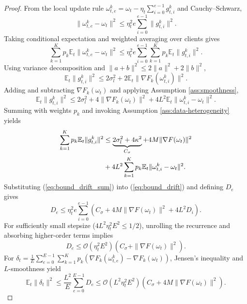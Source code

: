 \begin{proof}
From the local update rule $\omega_{t,e}^k=\omega_t-\eta_t\sum_{i=0}^{e-1}g_{t,i}^k$ and Cauchy--Schwarz,
\begin{equation}
\|\omega_{t,e}^k - \omega_t\|^2 \le \eta_t^2 e \sum_{i=0}^{e-1} \|g_{t,i}^k\|^2.
\end{equation}
Taking conditional expectation and weighted averaging over clients gives
\begin{equation}
\label{eq:bound_drift}
\sum_{k=1}^K p_k \mathbb{E}_t\|\omega_{t,e}^k - \omega_t\|^2
\le \eta_t^2 e \sum_{i=0}^{e-1} \sum_{k=1}^K p_k \mathbb{E}_t\|g_{t,i}^k\|^2.
\end{equation}
Using variance decomposition and $\|a+b\|^2 \le 2\|a\|^2+2\|b\|^2$,
\begin{equation}
\mathbb{E}_t\|g_{t,i}^k\|^2 \le 2\sigma_l^2 + 2\mathbb{E}_t\|\nabla F_k(\omega_{t,i}^k)\|^2.
\end{equation}
Adding and subtracting $\nabla F_k(\omega_t)$ and applying Assumption \ref{ass:smoothness},
\begin{equation}
\mathbb{E}_t\|g_{t,i}^k\|^2 \le 2\sigma_l^2 + 4\|\nabla F_k(\omega_t)\|^2 + 4L^2\mathbb{E}_t\|\omega_{t,i}^k - \omega_t\|^2.
\end{equation}
Summing with weights $p_k$ and invoking Assumption \ref{ass:data-heterogeneity} yields
\begin{align}
\label{eq:bound_drift_sum}
\sum_{k=1}^K p_k \mathbb{E}_t\|g_{t,i}^k\|^2
&\le \underbrace{2\sigma_l^2 + 4\kappa^2}_{C_\sigma} + 4M\|\nabla F(\omega_t)\|^2 \notag \\
&+ 4L^2 \sum_{k=1}^K p_k \mathbb{E}_t\|\omega_{t,i}^k - \omega_t\|^2.
\end{align}
Substituting (\ref{eq:bound_drift_sum}) into (\ref{eq:bound_drift}) and defining $D_e$ gives
\begin{equation}
D_e \le \eta_t^2 e \sum_{i=0}^{e-1} \left( C_\sigma + 4M\|\nabla F(\omega_t)\|^2 + 4L^2 D_i \right).
\end{equation}
For sufficiently small stepsize ($4L^2\eta_t^2 E^2 \le 1/2$), unrolling the recurrence and absorbing higher-order terms implies
\begin{equation}
D_e \le \mathcal{O}(\eta_t^2 E^2) \left( C_\sigma + \|\nabla F(\omega_t)\|^2 \right).
\end{equation}
For $\delta_t = \frac{1}{E} \sum_{e=0}^{E-1} \sum_{k=1}^K p_k (\nabla F_k(\omega_{t,e}^k) - \nabla F_k(\omega_t))$, Jensen's inequality and $L$-smoothness yield
\begin{equation}
\mathbb{E}_t\|\delta_t\|^2\!\le\!\frac{L^2}{E}\sum_{e=0}^{E-1}D_e\!\le\!\mathcal{O}\!\left(\!L^2\eta_t^2E^2\!\right)\!\left(\!C_\sigma\!+\!4M\|\nabla F(\omega_t)\|^2\!\right).
\end{equation}
\end{proof}


